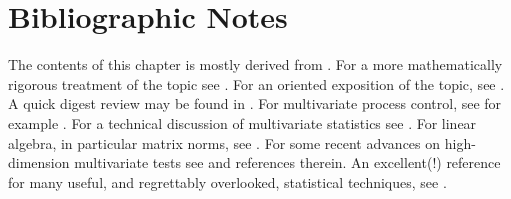 \section{Bibliographic Notes}
The contents of this chapter is mostly derived from \cite{montgomery_introduction_2007}. 
For a more mathematically rigorous treatment of the topic see \cite{basseville_detection_1993}.
For an \R oriented exposition of the topic, see \cite{qiu_introduction_2013}.
A quick digest review may be found in \cite{natrella_nist/sematech_2010}.
For multivariate process control, see for example \cite{ge_multivariate_2012}. 
For a technical discussion of multivariate statistics see \cite{anderson_introduction_2003}. 
For linear algebra, in particular matrix norms, see \cite{meyer_matrix_2001}. 
For some recent advances on high-dimension multivariate tests see \cite{srivastava_testing_2013} and references therein.
An excellent(!) reference for many useful, and regrettably overlooked, statistical techniques, see \cite{wilcox_introduction_2005}.
